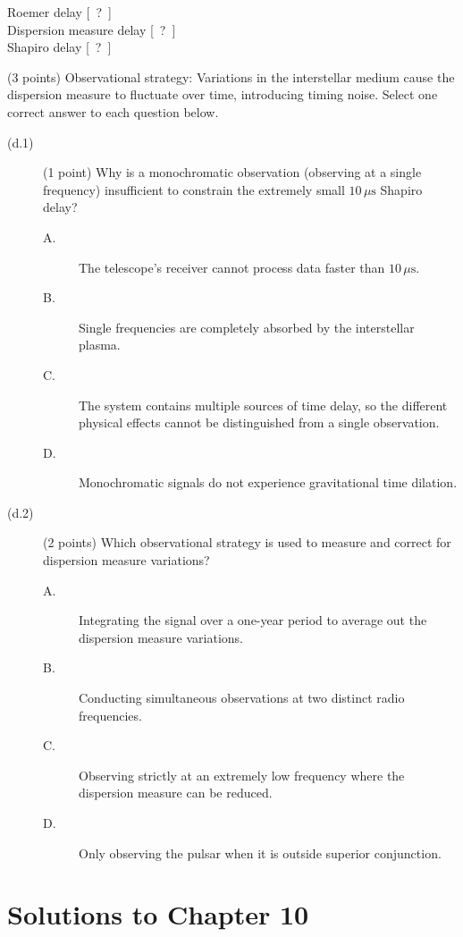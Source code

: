 \begin{description}
  Roemer delay [\ ?\ ]\\
  Dispersion measure delay [\ ?\ ]\\
  Shapiro delay [\ ?\ ]
\item[(d)] (3 points) Observational strategy: Variations in the interstellar
  medium cause the dispersion measure to fluctuate over time, introducing
  timing noise. Select one correct answer to each question below.
  \begin{description}
  \item[(d.1)] (1 point) Why is a monochromatic observation (observing at a
    single frequency) insufficient to constrain the extremely small
    $10\,\mu\mathrm{s}$ Shapiro delay?
    \begin{description}
    \item[A.] The telescope's receiver cannot process data faster than
      $10\,\mu\mathrm{s}$.
    \item[B.] Single frequencies are completely absorbed by the interstellar
      plasma.
    \item[C.] The system contains multiple sources of time delay, so the
      different physical effects cannot be distinguished from a single
      observation.
    \item[D.] Monochromatic signals do not experience gravitational time
      dilation.
    \end{description}
  \item[(d.2)] (2 points) Which observational strategy is used to measure and
    correct for dispersion measure variations?
    \begin{description}
    \item[A.] Integrating the signal over a one-year period to average out
      the dispersion measure variations.
    \item[B.] Conducting simultaneous observations at two distinct radio
      frequencies.
    \item[C.] Observing strictly at an extremely low frequency where the
      dispersion measure can be reduced.
    \item[D.] Only observing the pulsar when it is outside superior
      conjunction.
    \end{description}
  \end{description}
\end{description}

\clearpage
\section*{Solutions to Chapter 10}

